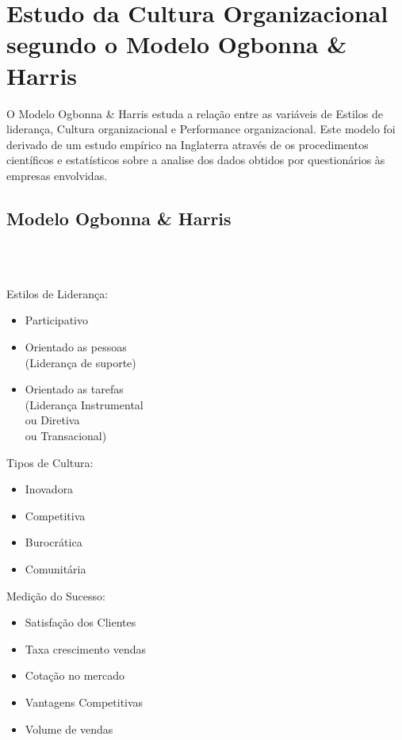 \section{Estudo da Cultura Organizacional segundo o Modelo Ogbonna \& Harris}
\qquad O Modelo Ogbonna \& Harris estuda a relação entre as variáveis de Estilos de liderança, Cultura organizacional e Performance organizacional. Este modelo foi derivado de um estudo empírico na Inglaterra através de os procedimentos científicos e estatísticos sobre a analise dos dados obtidos por questionários às empresas envolvidas.\\
\subsection{Modelo Ogbonna \& Harris}
 \\
\\
\begin{minipage}[t]{.31\linewidth}
\quad Estilos de Liderança:
\begin{itemize}
\setlength\itemsep{-0.3em}
\item Participativo
\item Orientado as pessoas\\
(Liderança de suporte)
\item Orientado as tarefas\\
(Liderança Instrumental\\ ou Diretiva\\ ou Transacional)
\end{itemize}
\end{minipage}
\begin{minipage}[t]{.31\linewidth}
\quad Tipos de Cultura:
\begin{itemize}
\setlength\itemsep{-0.3em}
\item Inovadora
\item Competitiva
\item Burocrática
\item Comunitária
\end{itemize}
\end{minipage}
\begin{minipage}[t]{.31\linewidth}
\quad Medição do Sucesso:
\begin{itemize}
\setlength\itemsep{-0.3em}
\item Satisfação dos Clientes
\item Taxa crescimento vendas
\item Cotação no mercado
\item Vantagens Competitivas
\item Volume de vendas
\end{itemize}
\end{minipage}
